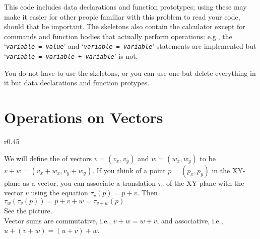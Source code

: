 \documentclass[12pt]{article}
\begin{document}
This code includes data declarations and function prototypes;
using these may make it easier
for other people familiar with this problem to read your
code, should that be important.
The skeletons also contain the calculator except for
commands and function bodies that actually perform operations: e.g.,
the `{\tt {\em variable} = {\em value}}' and
`{\tt {\em variable} = {\em variable}}' statements are
implemented but `{\tt {\em variable} = {\em variable} + {\em variable}}'
is not.

You do not have to use the skeletons, or you can use one but delete
everything in it but data declarations and function protypes.
 


\section{Operations on Vectors}
\begin{minipage}{\textwidth}\raggedright
\begin{wrapfigure}{r}{0.45\textwidth}
\end{wrapfigure}
We will define the  of vectors $v=(v_x,v_y)$ and
$w=(w_x,w_y)$ to be $v+w=(v_x+w_x,v_y+w_y)$.  If you
think of a point $p=(p_x,p_y)$ in the XY-plane as a vector,
you can associate a translation $\tau_v$ of the XY-plane
with the vector $v$ using the equation $\tau_v(p)=p+v$.  Then\\
\hspace*{0.2in}$\tau_w(\tau_v(p)) = p+v+w = \tau_{v+w}(p)$ \\
See the picture.
\\[1ex]
Vector sums are commutative, i.e.,  $v+w=w+v$, and associative,
i.e., $u+(v+w)=(u+v)+w$.
\end{minipage}
\end{document}
